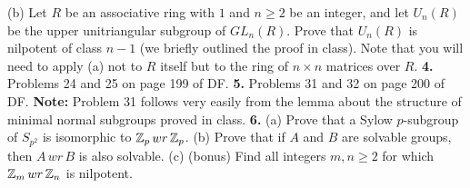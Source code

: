 \documentclass[12pt]{amsart}
\begin{document}
(b) Let $R$ be an associative ring with $1$ and $n\geq 2$ be an integer, and let
$U_n(R)$ be the upper unitriangular subgroup of $GL_n(R)$. Prove that $U_n(R)$
is nilpotent of class $n-1$ (we briefly outlined the proof in class). Note that you
will need to apply (a) not to $R$ itself but to the ring of $n\times n$ matrices over $R$.
\skv
{\bf 4.} Problems 24 and 25 on page 199 of DF.
\skv
{\bf 5.} Problems 31 and 32 on page 200 of DF. {\bf Note:} Problem 31 follows
very easily from the lemma about the structure of minimal normal subgroups proved in class.
\skv
{\bf 6. }(a) Prove that a Sylow $p$-subgroup of $S_{p^2}$ is isomorphic to ${\mathbb Z}_p \,wr\, {\mathbb Z}_p$.
\skv
(b) Prove that if $A$ and $B$ are solvable groups, then $A\, wr\, B$ is also solvable.
\skv
(c) (bonus) Find all integers $m,n\geq 2$ for which ${\mathbb Z}_m \,wr\, {\mathbb Z}_n$ is nilpotent.  
\end{document}
